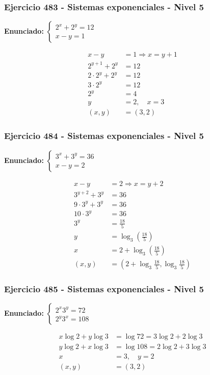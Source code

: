 \documentclass[12pt,a4paper]{article}
\begin{document}
\subsubsection*{Ejercicio 483 - Sistemas exponenciales - Nivel 5}
\textbf{Enunciado:} \(\begin{cases}2^x+2^y=12\\ x-y=1\end{cases}\)

\[
\begin{aligned}
x-y&=1\Rightarrow x=y+1\\
2^{y+1}+2^y&=12\\
2\cdot2^y+2^y&=12\\
3\cdot2^y&=12\\
2^y&=4\\
y&=2,
\quad x=3\\
(x,y)&=\boxed{(3,2)}
\end{aligned}
\]


\subsubsection*{Ejercicio 484 - Sistemas exponenciales - Nivel 5}
\textbf{Enunciado:} \(\begin{cases}3^x+3^y=36\\ x-y=2\end{cases}\)

\[
\begin{aligned}
x-y&=2\Rightarrow x=y+2\\
3^{y+2}+3^y&=36\\
9\cdot3^y+3^y&=36\\
10\cdot3^y&=36\\
3^y&=\frac{18}{5}\\
y&=\log_3\left(\frac{18}{5}\right)\\
x&=2+\log_3\left(\frac{18}{5}\right)\\
(x,y)&=\boxed{\left(2+\log_3\frac{18}{5},\log_3\frac{18}{5}\right)}
\end{aligned}
\]


\subsubsection*{Ejercicio 485 - Sistemas exponenciales - Nivel 5}
\textbf{Enunciado:} \(\begin{cases}2^x3^y=72\\ 2^y3^x=108\end{cases}\)

\[
\begin{aligned}
x\log2+y\log3&=\log72=3\log2+2\log3\\
y\log2+x\log3&=\log108=2\log2+3\log3\\
x&=3,
\quad y=2\\
(x,y)&=\boxed{(3,2)}
\end{aligned}
\]
\end{document}
